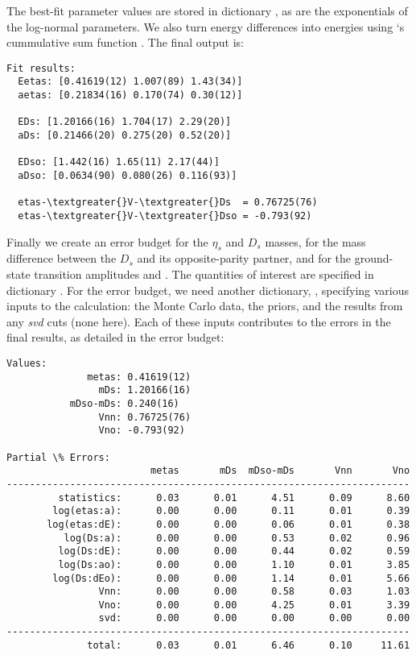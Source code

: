 \documentclass[letterpaper,10pt,english]{sphinxmanual}
\begin{document}
The best-fit parameter values are stored in dictionary ,
as are the exponentials of the log-normal parameters.
We also turn energy differences into energies using `s cummulative
sum function . The final output is:

\begin{Verbatim}[commandchars=\\\{\}]
Fit results:
  Eetas: [0.41619(12) 1.007(89) 1.43(34)]
  aetas: [0.21834(16) 0.170(74) 0.30(12)]

  EDs: [1.20166(16) 1.704(17) 2.29(20)]
  aDs: [0.21466(20) 0.275(20) 0.52(20)]

  EDso: [1.442(16) 1.65(11) 2.17(44)]
  aDso: [0.0634(90) 0.080(26) 0.116(93)]

  etas-\textgreater{}V-\textgreater{}Ds  = 0.76725(76)
  etas-\textgreater{}V-\textgreater{}Dso = -0.793(92)
\end{Verbatim}

Finally we  create an error budget for the $\eta_s$
and $D_s$ masses, for the mass difference between the $D_s$ and its
opposite-parity partner, and for the ground-state transition amplitudes
 and . The quantities of interest are specified in dictionary
. For the error budget, we need another dictionary, ,
specifying various inputs to the calculation: the Monte Carlo data, the
priors, and the results from any \emph{svd} cuts (none here). Each of these inputs
contributes to the errors in the final results, as detailed in the
error budget:

\begin{Verbatim}[commandchars=\\\{\}]
Values:
              metas: 0.41619(12)
                mDs: 1.20166(16)
           mDso-mDs: 0.240(16)
                Vnn: 0.76725(76)
                Vno: -0.793(92)

Partial \% Errors:
                         metas       mDs  mDso-mDs       Vnn       Vno
----------------------------------------------------------------------
         statistics:      0.03      0.01      4.51      0.09      8.60
        log(etas:a):      0.00      0.00      0.11      0.01      0.39
       log(etas:dE):      0.00      0.00      0.06      0.01      0.38
          log(Ds:a):      0.00      0.00      0.53      0.02      0.96
         log(Ds:dE):      0.00      0.00      0.44      0.02      0.59
         log(Ds:ao):      0.00      0.00      1.10      0.01      3.85
        log(Ds:dEo):      0.00      0.00      1.14      0.01      5.66
                Vnn:      0.00      0.00      0.58      0.03      1.03
                Vno:      0.00      0.00      4.25      0.01      3.39
                svd:      0.00      0.00      0.00      0.00      0.00
----------------------------------------------------------------------
              total:      0.03      0.01      6.46      0.10     11.61
\end{Verbatim}
\end{document}
